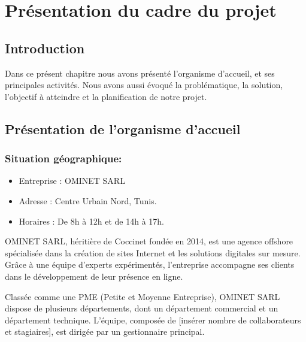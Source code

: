 \chapter{Présentation du cadre du projet} 
 

\section*{Introduction} %
Dans ce présent chapitre nous avons présenté l’organisme d’accueil, et ses principales activités. Nous avons aussi évoqué la problématique, la solution, l’objectif à atteindre et la planification de notre projet.
\renewcommand{\thesection}{\Roman{section}.} %
\renewcommand{\thesubsection}{\arabic{subsection}.} %
\renewcommand{\thesubsubsection}{\thesubsection\arabic{subsubsection}} %

\setcounter{secnumdepth}{3} 
\section{Présentation de l'organisme d'accueil}
\subsection{Situation géographique:}
\begin{itemize}
    \item Entreprise : OMINET SARL 
    \item Adresse : Centre Urbain Nord, Tunis. 
    \item Horaires : De 8h à 12h et de 14h à 17h.
\end{itemize}

OMINET SARL, héritière de Coccinet fondée en 2014, est une agence offshore spécialisée dans la création de sites Internet et les solutions digitales sur mesure. Grâce à une équipe d'experts expérimentés, l’entreprise accompagne ses clients dans le développement de leur présence en ligne.

Classée comme une PME (Petite et Moyenne Entreprise), OMINET SARL dispose de plusieurs départements, dont un département commercial et un département technique. L'équipe, composée de [insérer nombre de collaborateurs et stagiaires], est dirigée par un gestionnaire principal.


